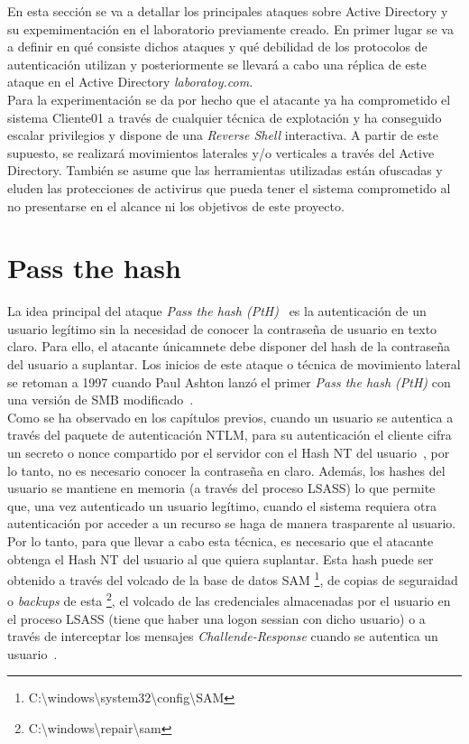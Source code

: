En esta sección se va a detallar los principales ataques sobre Active Directory y su expemimentación en el laboratorio previamente creado. En primer lugar se va a definir en qué consiste dichos ataques y qué debilidad de los protocolos de autenticación utilizan y posteriormente se llevará a cabo una réplica de este ataque en el Active Directory {\it laboratoy.com}. \\

Para la experimentación se da por hecho que el atacante ya ha comprometido el sistema Cliente01 a través de cualquier técnica de explotación y ha conseguido escalar privilegios y dispone de una {\it Reverse Shell} interactiva. A partir de este supuesto, se realizará movimientos laterales y/o verticales a través del Active Directory. También se asume que las herramientas utilizadas están ofuscadas y eluden las protecciones de activirus que pueda tener el sistema comprometido al no presentarse en el alcance ni los objetivos de este proyecto.

\section{Pass the hash}

La idea principal del ataque {\it Pass the hash (PtH)}~\cite{Capitulo5:PtHMitre} es la autenticación de un usuario legítimo sin la necesidad de conocer la contraseña de usuario en texto claro. Para ello, el atacante únicamnete debe disponer del hash de la contraseña del usuario a suplantar. Los inicios de este ataque o técnica de movimiento lateral se retoman a 1997 cuando Paul Ashton lanzó el primer {\it Pass the hash (PtH)} con una versión de SMB modificado~\cite{Capitulo5:Paul}.\\

Como se ha observado en los capítulos previos, cuando un usuario se autentica a través del paquete de autenticación NTLM, para su autenticación el cliente cifra un secreto o nonce compartido por el servidor con el Hash NT del usuario~\cite{Capitulo5:HackingWindows}, por lo tanto, no es necesario conocer la contraseña en claro. Además, los hashes del usuario se mantiene en memoria (a través del proceso LSASS) lo que permite que, una vez autenticado un usuario legítimo, cuando el sistema requiera otra autenticación por acceder a un recurso se haga de manera trasparente al usuario.\\ 

Por lo tanto, para que llevar a cabo esta técnica, es necesario que el atacante obtenga el Hash NT del usuario al que quiera suplantar. Esta hash puede ser obtenido a través del volcado de la base de datos SAM \footnote{C:\textbackslash{}windows\textbackslash{}system32\textbackslash{}config\textbackslash{}SAM}, de copias de seguraidad o {\it backups} de esta \footnote{C:\textbackslash{}windows\textbackslash{}repair\textbackslash{}sam}, el volcado de las credenciales almacenadas por el usuario en el proceso LSASS (tiene que haber una logon sessian con dicho usuario) o a través de interceptar los mensajes {\it Challende-Response} cuando se autentica un usuario~\cite{Capitulo5:PtH}. \\

